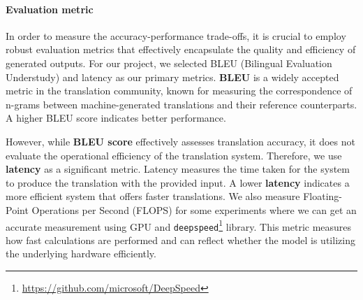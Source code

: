 \documentclass[11pt]{article}
\begin{document}
\paragraph{Evaluation metric}
In order to measure the accuracy-performance trade-offs, it is crucial to employ robust evaluation metrics that effectively encapsulate the quality and efficiency of generated outputs. For our project, we selected BLEU (Bilingual Evaluation Understudy) and latency as our primary metrics.
\textbf{BLEU} is a widely accepted metric in the translation community, known for measuring the correspondence of n-grams between machine-generated translations and their reference counterparts. A higher BLEU score indicates better performance.

However, while \textbf{BLEU score} effectively assesses translation accuracy, it does not evaluate the operational efficiency of the translation system. Therefore, we use \textbf{latency} as a significant metric. Latency measures the time taken for the system to produce the translation with the provided input. A lower \textbf{latency} indicates a more efficient system that offers faster translations.
We also measure Floating-Point Operations per Second (FLOPS) for some experiments where we can get an accurate measurement using GPU and \texttt{deepspeed}\footnote{\url{https://github.com/microsoft/DeepSpeed}} library. This metric measures how fast calculations are performed and can reflect whether the model is utilizing the underlying hardware efficiently.
\end{document}

